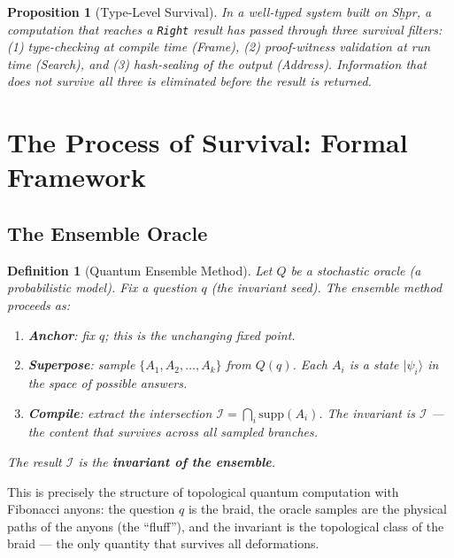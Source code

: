 \documentclass[11pt,letterpaper]{article}
\newtheorem{definition}[theorem]{Definition}
\newtheorem{proposition}[theorem]{Proposition}
\begin{document}
\begin{proposition}[Type-Level Survival]
In a well-typed system built on \textit{Sḫpr}, a computation that reaches a
\texttt{Right} result has passed through three survival filters:
(1) type-checking at compile time (Frame),
(2) proof-witness validation at run time (Search), and
(3) hash-sealing of the output (Address).
Information that does not survive all three is eliminated before the result
is returned.
\end{proposition}

\section{The Process of Survival: Formal Framework}
\label{sec:survival}

\subsection{The Ensemble Oracle}

\begin{definition}[Quantum Ensemble Method]
\label{def:ensemble}
Let $Q$ be a stochastic oracle (a probabilistic model).  Fix a question
$q$ (the \emph{invariant seed}).  The ensemble method proceeds as:
\begin{enumerate}[nosep]
\item \textbf{Anchor}: fix $q$; this is the unchanging fixed point.
\item \textbf{Superpose}: sample $\{A_1, A_2, \ldots, A_k\}$ from $Q(q)$.
  Each $A_i$ is a state $|\psi_i\rangle$ in the space of possible answers.
\item \textbf{Compile}: extract the intersection $\mathcal{I} = \bigcap_i \mathrm{supp}(A_i)$.
  The invariant is $\mathcal{I}$ --- the content that survives across all
  sampled branches.
\end{enumerate}
The result $\mathcal{I}$ is the \textbf{invariant of the ensemble}.
\end{definition}

This is precisely the structure of topological quantum computation with
Fibonacci anyons: the question $q$ is the braid, the oracle samples are the
physical paths of the anyons (the ``fluff''), and the invariant is the
topological class of the braid --- the only quantity that survives all
deformations.
\end{document}
